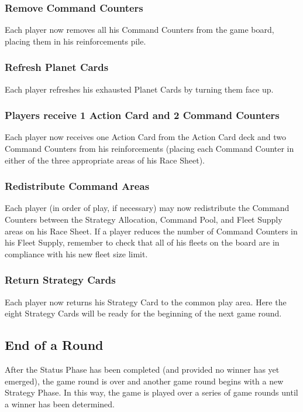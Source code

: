 \documentclass[11pt,fleqn]{book} %
\begin{document}
\subsubsection{Remove Command Counters}
Each player now removes all his Command Counters from the game board, placing them in his reinforcements pile.


\subsubsection{Refresh Planet Cards}
Each player refreshes his exhausted Planet Cards by turning them face up.

\subsubsection{Players receive 1 Action Card and 2 Command Counters}
Each player now receives one Action Card from the Action Card deck and two Command Counters from his reinforcements (placing each Command Counter in either of the three appropriate areas of his Race Sheet).

\subsubsection{Redistribute Command Areas}
Each player (in order of play, if necessary) may now redistribute the Command Counters between the Strategy Allocation, Command Pool, and Fleet Supply areas on his Race Sheet. If a player reduces the number of Command Counters in his Fleet Supply, remember to check that all of his fleets on the board are in compliance with his new fleet size limit.

\subsubsection{Return Strategy Cards}
Each player now returns his Strategy Card to the common play area. Here the eight Strategy Cards will be ready for the beginning of the next game round.


\subsection{End of a Round}
After the Status Phase has been completed (and provided no winner has yet emerged), the game round is over and another game round begins with a new Strategy Phase. In this way, the game is played over a series of game rounds until a winner has been determined.
\end{document}
